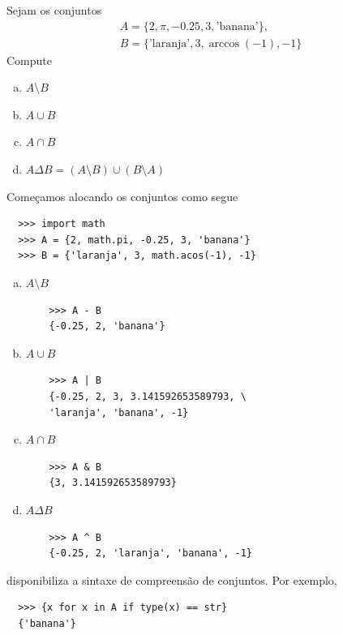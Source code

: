 \documentclass[12pt]{article}
\begin{document}
\begin{ex}
  Sejam os conjuntos
  \begin{gather}
    A = \{2, \pi, -0.25, 3, \text{'banana'}\},\\
    B = \{\text{'laranja'}, 3, \operatorname{arc cos}(-1), -1\}
  \end{gather}
  Compute
  \begin{enumerate}[a)]
  \item $A\setminus B$
  \item $A\cup B$
  \item $A\cap B$
  \item $A\Delta B = (A\setminus B) \cup (B\setminus A)$
  \end{enumerate}

   Começamos alocando os conjuntos como segue
  \begin{lstlisting}
  >>> import math
  >>> A = {2, math.pi, -0.25, 3, 'banana'}
  >>> B = {'laranja', 3, math.acos(-1), -1}
  \end{lstlisting}
  
  \begin{enumerate}[a)]
  \item $A\setminus B$
    \begin{lstlisting}
    >>> A - B
    {-0.25, 2, 'banana'}
    \end{lstlisting}
  \item $A\cup B$
    \begin{lstlisting}
    >>> A | B
    {-0.25, 2, 3, 3.141592653589793, \
    'laranja', 'banana', -1}
    \end{lstlisting}
  \item $A\cap B$
    \begin{lstlisting}
    >>> A & B
    {3, 3.141592653589793}
    \end{lstlisting}
  \item $A\Delta B$
    \begin{lstlisting}
    >>> A ^ B
    {-0.25, 2, 'laranja', 'banana', -1}
    \end{lstlisting}
  \end{enumerate}
\end{ex}

\begin{obs}\label{obs:compreensão_de_conjuntos}
  {\python} disponibiliza a sintaxe de compreensão de conjuntos. Por exemplo,
  \begin{lstlisting}
  >>> {x for x in A if type(x) == str}
  {'banana'}
  \end{lstlisting}
\end{obs}
\end{document}
